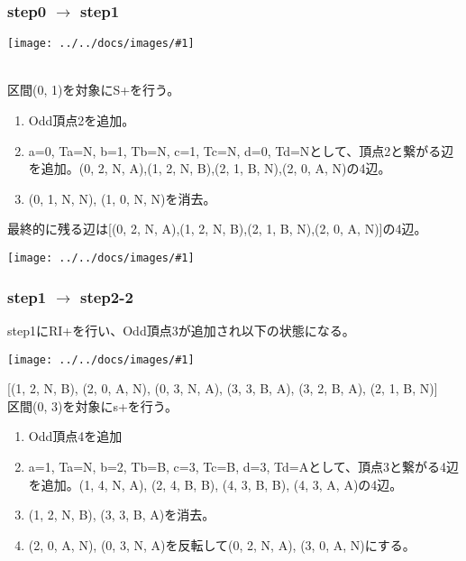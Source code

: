 \documentclass[11pt,a4j]{jreport}
\newcommand{\ikeg}[1]{\texttt{[image: ../../docs/images/\#1]}}
\begin{document}
\subsubsection{step0 $\rightarrow$ step1}
\begin{center}
    \ikeg{step0.jpg}\\
\end{center}

\text{[(0, 1, N, N), (1, 0, N, N)]}\\

区間(0, 1)を対象にS+を行う。\\
\begin{enumerate}
    \item Odd頂点2を追加。
    \item a=0, Ta=N, b=1, Tb=N, c=1, Tc=N, d=0, Td=Nとして、頂点2と繋がる辺を追加。(0, 2, N, A),(1, 2, N, B),(2, 1, B, N),(2, 0, A, N)の4辺。
    \item (0, 1, N, N), (1, 0, N, N)を消去。
\end{enumerate}

最終的に残る辺は[(0, 2, N, A),(1, 2, N, B),(2, 1, B, N),(2, 0, A, N)]の4辺。\\

\begin{center}
    \ikeg{step1.jpg}
\end{center}

\subsubsection{step1 $\rightarrow$ step2-2}
step1にRI+を行い、Odd頂点3が追加され以下の状態になる。
\begin{center}
    \ikeg{step1_riplus.jpg}\\
\end{center}
[(1, 2, N, B), (2, 0, A, N), (0, 3, N, A), (3, 3, B, A), (3, 2, B, A), (2, 1, B, N)]\\
区間(0, 3)を対象にs+を行う。\\

\begin{enumerate}
    \item Odd頂点4を追加
    \item a=1, Ta=N, b=2, Tb=B, c=3, Tc=B, d=3, Td=Aとして、頂点3と繋がる4辺を追加。(1, 4, N, A), (2, 4, B, B), (4, 3, B, B), (4, 3, A, A)の4辺。
    \item (1, 2, N, B), (3, 3, B, A)を消去。
    \item (2, 0, A, N), (0, 3, N, A)を反転して(0, 2, N, A), (3, 0, A, N)にする。
\end{enumerate}
\end{document}
